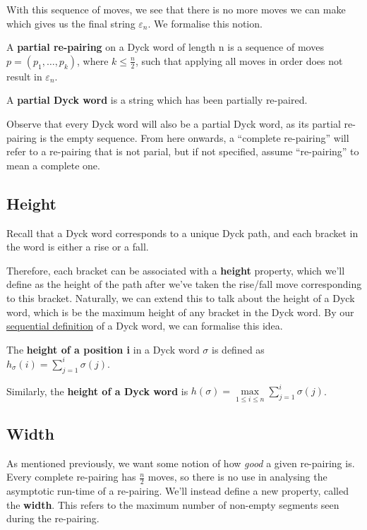 With this sequence of moves, we see that there is no more moves we can make which gives us the final string $\varepsilon_{n}$. We formalise this notion.

\begin{definition}
    A \textbf{partial re-pairing} on a Dyck word of length n is a sequence of moves $p = (p_{1},\dots,p_{k})$, where $k \leq \frac{n}{2}$, such that applying all moves in order does not result in $\varepsilon_{n}$.
\end{definition}

\begin{definition}
    A \textbf{partial Dyck word} is a string which has been partially re-paired.
\end{definition}

Observe that every Dyck word will also be a partial Dyck word, as its partial re-pairing is the empty sequence. From here onwards, a ``complete re-pairing'' will refer to a re-pairing that is not parial, but if not specified, assume ``re-pairing'' to mean a complete one. 

\subsection{Height}
Recall that a Dyck word corresponds to a unique Dyck path, and each bracket in the word is either a rise or a fall. 

Therefore, each bracket can be associated with a \textbf{height} property, which we'll define as the height of the path after we've taken the rise/fall move corresponding to this bracket. Naturally, we can extend this to talk about the height of a Dyck word, which is be the maximum height of any bracket in the Dyck word. By our \hyperref[def:seqDyck]{sequential definition} of a Dyck word, we can formalise this idea. 

\begin{definition}
    The \textbf{height of a position i} in a Dyck word $\sigma$ is defined as $h_{\sigma}(i) = \sum_{j=1}^{i}\sigma(j)$.

    Similarly, the \textbf{height of a Dyck word} is $h(\sigma) = \max\limits_{1\leq i\leq n}\sum_{j=1}^{i}\sigma(j)$.
\end{definition}

\subsection{Width}
As mentioned previously, we want some notion of how \textit{good} a given re-pairing is. Every complete re-pairing has $\frac{n}{2}$ moves, so there is no use in analysing the asymptotic run-time of a re-pairing. We'll instead define a new property, called the \textbf{width}. This refers to the maximum number of non-empty segments seen during the re-pairing. 

